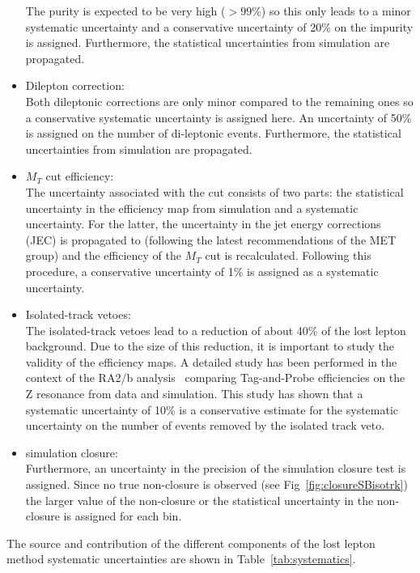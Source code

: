 \begin{itemize}
The purity is expected to be very high ($>99\%$) so this only leads to a minor systematic uncertainty and a conservative uncertainty of 20\% on the impurity is assigned. Furthermore, the statistical uncertainties from simulation are propagated.
\item Dilepton correction:\\
Both dileptonic corrections are only minor compared to the remaining ones so a conservative systematic uncertainty is assigned here.
An uncertainty of 50\% is assigned on the number of di-leptonic events. Furthermore, the statistical uncertainties from simulation are propagated.
\item $M_T$ cut efficiency:\\
  The uncertainty associated with the \MT cut consists of two parts: the statistical uncertainty in the efficiency map from simulation and a systematic uncertainty. For the latter, the uncertainty in the jet energy corrections (JEC) is propagated to \MET (following the latest recommendations of the MET group) and the efficiency of the $M_T$ cut is recalculated. Following this procedure, a conservative uncertainty of 1\% is assigned as a systematic uncertainty. 
\item Isolated-track vetoes:\\
  The isolated-track vetoes lead to a reduction of about 40\%
  of the lost lepton background. Due to the size of this reduction,
  it is important to study the validity of the efficiency maps. A detailed study has been performed in the context of the RA2/b analysis~\cite{Sirunyan:2017cwe} comparing Tag-and-Probe efficiencies on the Z resonance from data and simulation. This study has shown that a systematic uncertainty of 10\% is a conservative estimate for the systematic uncertainty on the number of events removed by the isolated track veto.
\item simulation closure:\\
Furthermore, an uncertainty in the precision of the simulation closure test is assigned. Since no true non-closure is observed (see Fig~\ref{fig:closureSBisotrk}) the larger value of the non-closure or the statistical uncertainty in the non-closure is assigned for each bin. 
\end{itemize}

The source and contribution of the different components of the lost lepton method systematic uncertainties are shown in Table~\ref{tab:systematics}.

